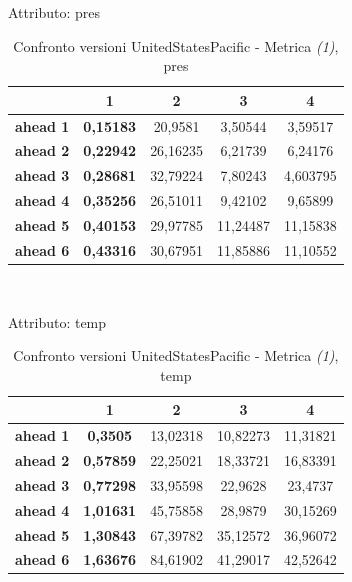 \documentclass[12pt,a4paper,oneside,openright]{book}
\begin{document}
\newpage

Attributo: pres \\ 

\begin{table}[H]
\centering
\begin{tabular}{|c|c|c|c|c|}
\hline
& 1 & 2 & 3 & 4 \\
\hline
\textbf{ahead 1} & \textbf{0,15183} & 20,9581 & 3,50544 & 3,59517\\
\hline
\textbf{ahead 2} & \textbf{0,22942} & 26,16235 & 6,21739 & 6,24176\\
\hline
\textbf{ahead 3} & \textbf{0,28681} & 32,79224 & 7,80243 & 4,603795\\
\hline
\textbf{ahead 4} & \textbf{0,35256} & 26,51011 & 9,42102 & 9,65899\\
\hline
\textbf{ahead 5} & \textbf{0,40153} & 29,97785 & 11,24487 & 11,15838\\
\hline
\textbf{ahead 6} & \textbf{0,43316} & 30,67951 & 11,85886 & 11,10552\\
\hline
\end{tabular} \\
\caption{Confronto versioni UnitedStatesPacific - Metrica \textit{(1)}, pres}
\end{table} 

\medskip

Attributo: temp \\ 

\begin{table}[H]
\centering
\begin{tabular}{|c|c|c|c|c|}
\hline
& 1 & 2 & 3 & 4 \\
\hline
\textbf{ahead 1} & \textbf{0,3505} & 13,02318 & 10,82273 & 11,31821\\
\hline
\textbf{ahead 2} & \textbf{0,57859} & 22,25021 & 18,33721 & 16,83391\\
\hline
\textbf{ahead 3} & \textbf{0,77298} & 33,95598 & 22,9628 & 23,4737\\
\hline
\textbf{ahead 4} & \textbf{1,01631} & 45,75858 & 28,9879 & 30,15269\\
\hline
\textbf{ahead 5} & \textbf{1,30843} & 67,39782 & 35,12572 & 36,96072\\
\hline
\textbf{ahead 6} & \textbf{1,63676} & 84,61902 & 41,29017 & 42,52642\\
\hline
\end{tabular} \\
\caption{Confronto versioni UnitedStatesPacific - Metrica \textit{(1)}, temp}
\end{table} 
\end{document}
